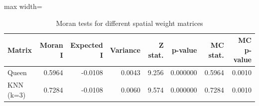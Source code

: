 \begin{table}[ht]
\centering
\caption{Moran tests for different spatial weight matrices} 
\label{tab:moran_global}
\begin{adjustbox}{max width=\linewidth}
\begin{tabular}{lrrrrrrr}
  \toprule
Matrix & Moran I & Expected I & Variance & Z stat. & p-value & MC stat. & MC p-value \\ 
  \midrule
Queen & 0.5964 & -0.0108 & 0.0043 & 9.256 & 0.000000 & 0.5964 & 0.0010 \\ 
  KNN (k=3) & 0.7284 & -0.0108 & 0.0060 & 9.574 & 0.000000 & 0.7284 & 0.0010 \\ 
   \bottomrule
\end{tabular}
\end{adjustbox}
\end{table}
